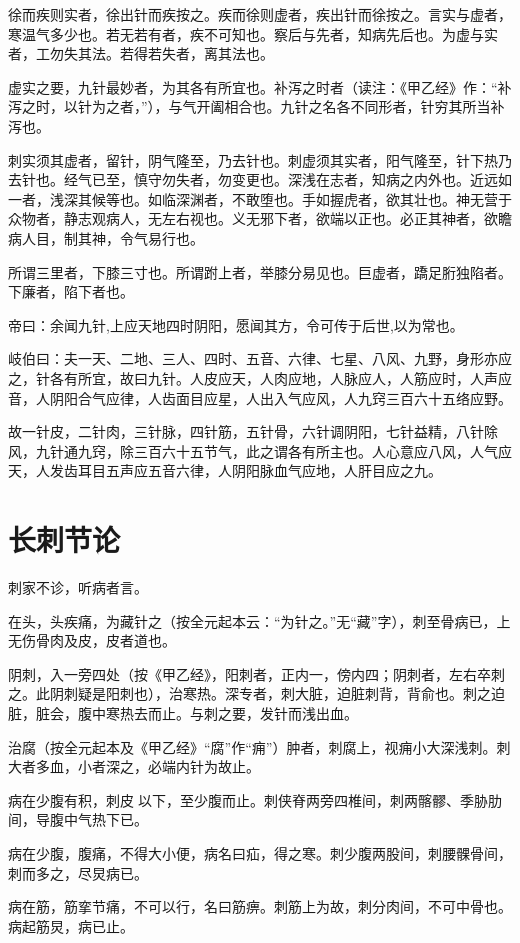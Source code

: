\documentclass{article}%
\begin{document}
徐而疾则实者，徐出针而疾按之。疾而徐则虚者，疾出针而徐按之。言实与虚者，寒温气多少也。若无若有者，疾不可知也。察后与先者，知病先后也。为虚与实者，工勿失其法。若得若失者，离其法也。

虚实之要，九针最妙者，为其各有所宜也。补泻之时者（读注：《甲乙经》作：“补泻之时，以针为之者，”），与气开阖相合也。九针之名各不同形者，针穷其所当补泻也。

刺实须其虚者，留针，阴气隆至，乃去针也。刺虚须其实者，阳气隆至，针下热乃去针也。经气已至，慎守勿失者，勿变更也。深浅在志者，知病之内外也。近远如一者，浅深其候等也。如临深渊者，不敢堕也。手如握虎者，欲其壮也。神无营于众物者，静志观病人，无左右视也。义无邪下者，欲端以正也。必正其神者，欲瞻病人目，制其神，令气易行也。

所谓三里者，下膝三寸也。所谓跗上者，举膝分易见也。巨虚者，蹻足胻独陷者。下廉者，陷下者也。

帝曰：余闻九针,上应天地四时阴阳，愿闻其方，令可传于后世,以为常也。

岐伯曰：夫一天、二地、三人、四时、五音、六律、七星、八风、九野，身形亦应之，针各有所宜，故曰九针。人皮应天，人肉应地，人脉应人，人筋应时，人声应音，人阴阳合气应律，人齿面目应星，人出入气应风，人九窍三百六十五络应野。

故一针皮，二针肉，三针脉，四针筋，五针骨，六针调阴阳，七针益精，八针除风，九针通九窍，除三百六十五节气，此之谓各有所主也。人心意应八风，人气应天，人发齿耳目五声应五音六律，人阴阳脉血气应地，人肝目应之九。
\section{长刺节论}
刺家不诊，听病者言。

在头，头疾痛，为藏针之（按全元起本云：“为针之。”无“藏”字），刺至骨病已，上无伤骨肉及皮，皮者道也。

阴刺，入一旁四处（按《甲乙经》，阳刺者，正内一，傍内四；阴刺者，左右卒刺之。此阴刺疑是阳刺也），治寒热。深专者，刺大脏，迫脏刺背，背俞也。刺之迫脏，脏会，腹中寒热去而止。与刺之要，发针而浅出血。

治腐（按全元起本及《甲乙经》“腐”作“痈”）肿者，刺腐上，视痈小大深浅刺。刺大者多血，小者深之，必端内针为故止。

病在少腹有积，刺皮𩩻以下，至少腹而止。刺侠脊两旁四椎间，刺两髂髎、季胁肋间，导腹中气热下已。

病在少腹，腹痛，不得大小便，病名曰疝，得之寒。刺少腹两股间，刺腰髁骨间，刺而多之，尽炅病已。

病在筋，筋挛节痛，不可以行，名曰筋痹。刺筋上为故，刺分肉间，不可中骨也。病起筋炅，病已止。
\end{document}
